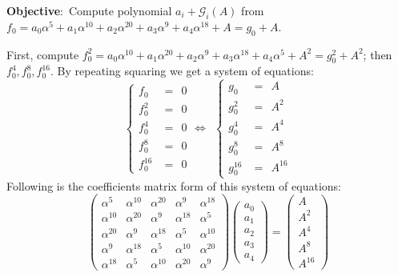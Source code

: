 \begin{Example}
{\bf Objective}:\ Compute polynomial $a_i + \mathcal{G}_i(A)$ from $f_0 = a_0\alpha^5+a_1\alpha^{10}+a_2\alpha^{20}+a_3\alpha^9+a_4\alpha^{18}+A
 = g_0 + A$.

First, compute $f_0^2= a_0\alpha^{10}+a_1\alpha^{20}+a_2\alpha^{9}+a_3\alpha^{18}+a_4\alpha^{5}+A^2 = g_0^2 + A^2$;
then $f_0^4, f_0^8, f_0^{16}$. By repeating squaring we get a system of equations:
\begin{displaymath}
  \begin{cases}
  f_0  &=\ \  0\\
  f_0^2 & =\ \  0\\
  f_0^4  &=\ \  0\\
  f_0^8  &=\ \  0\\
  f_0^{16} & =\ \ 0
  \end{cases}
\Longleftrightarrow\ \
\begin{cases}
  g_0 & =\ \  A\\
  g_0^2 & =\ \  A^2\\
  g_0^4 & =\ \  A^4\\
  g_0^8 & =\ \  A^8\\
  g_0^{16} & =\ \  A^{16}
  \end{cases}
\end{displaymath}
Following is the coefficients matrix form of this system of equations:
\begin{displaymath}
\begin{pmatrix}
\alpha^5 & \alpha^{10} & \alpha^{20} & \alpha^9 & \alpha^{18} \\
\alpha^{10} & \alpha^{20} & \alpha^9 & \alpha^{18} & \alpha^5 \\
\alpha^{20} & \alpha^9 & \alpha^{18} & \alpha^5 & \alpha^{10} \\
\alpha^9 & \alpha^{18} & \alpha^5 & \alpha^{10} & \alpha^{20} \\
\alpha^{18} & \alpha^5 & \alpha^{10} & \alpha^{20} & \alpha^9 
\end{pmatrix}
\begin{pmatrix}
a_0\\
a_1\\
a_2\\
a_3\\
a_4
\end{pmatrix}
=
\begin{pmatrix}
A\\
A^2\\
A^4\\
A^8\\
A^{16}
\end{pmatrix}
\end{displaymath}


\end{Example}
